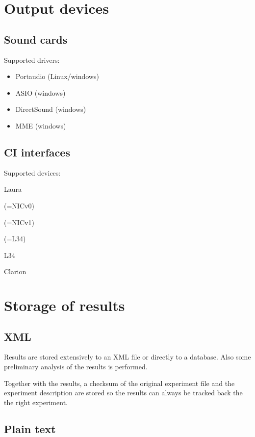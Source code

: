 \documentclass[a4paper,12pt]{article}
\begin{document}
\section{Output devices}

\subsection{Sound cards}

Supported drivers:

\begin{itemize}
\item Portaudio (Linux/windows)
\item ASIO (windows)
\item DirectSound (windows)
\item MME (windows)
\end{itemize}


\subsection{CI interfaces}

Supported devices:

\begin{description}
\item Laura
\item[NIC] (=NICv0)
\item[NICStream] (=NICv1)
\item[NICv2] (=L34)
\item L34
\item Clarion
\end{description}

\section{Storage of results}

\subsection{XML}

Results are stored extensively to an XML file or directly to a database. Also some preliminary analysis of the results is performed.

Together with the results, a checksum of the original experiment file and the experiment description are stored so the results can always be tracked back the the right experiment.

\subsection{Plain text}
\end{document}
